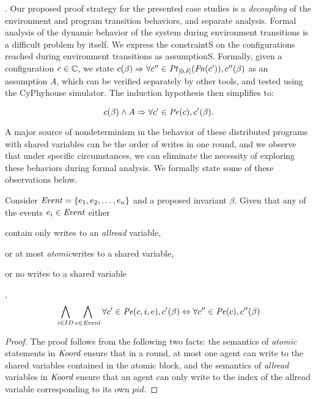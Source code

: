. Our proposed proof strategy for the presented case studies is a \emph{decoupling} of the environment and program transition behaviors, and separate analysis. Formal analysis of the dynamic behavior of the system during environment transitions is a difficult problem by itself. We express the constraintS on the configurations reached during environment transitions as assumptionS. Formally, given a configuration $c\in \mathbb{C}$, we state $c(\beta) \Rightarrow \forall c'' \in \mathit{Pt}_{[0,\delta]}(\mathit{Fn}(c')) , c''(\beta)$ as an assumption $A$, which can be verified separately by other tools, and tested using the CyPhyhouse simulator. The induction hypothesis then simplifies to:

$$ c(\beta) \wedge A \Rightarrow \forall c' \in \mathit{Pe}(c), c'(\beta).$$




 A major source of nondeterminism in the behavior of these distributed programs with shared variables can be the order of writes in one round, and we observe that under specific circumstances, we can eliminate the necessity of exploring these behaviors during formal analysis. We formally state some of these observations below.




\begin{lemma}
    \label{noninter}
     Consider $\mathit{Event} = \left\{e_1,e_2,\ldots, e_n\right\}$ and a proposed invariant $\beta$. Given that any of the events $e_i\in \mathit{Event}$  either \begin{inparaenum} [(i)]\item contain only writes to an \emph{allread} variable, \item or at most \emph{atomic}writes to a shared variable, \item or no writes to a shared variable \end{inparaenum},
    $$ \bigwedge_{i\in ID}\bigwedge_{e \in \mathit{Event}} \forall c' \in  \mathit{Pe}(c, i, e),  c'(\beta) \Leftrightarrow \forall c'' \in \mathit{Pe}(c), c''(\beta) $$
\end{lemma}
\begin{proof}
    The proof follows from the following two facts: the semantics of \emph{atomic} statements in $\emph{Koord}$ ensure that in a round, at most one agent can write to the shared variables contained in the atomic block, and the semantics of \emph{allread} variables in $\emph{Koord}$ ensure that an agent can only write to the index of the allread variable corresponding to its own $pid$.
\end{proof}

